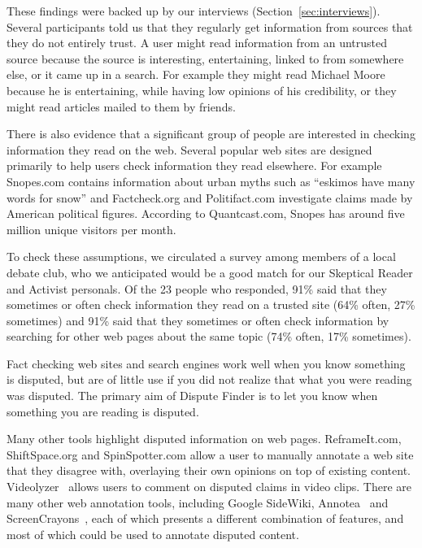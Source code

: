 \documentclass{www2010-submission}
\newcommand{\todo}[1]{}
\begin{document}
These findings were backed up by our interviews (Section~\ref{sec:interviews}). Several participants told us that they regularly get information from sources that they do not entirely trust. A user might read information from an untrusted source because the source is interesting, entertaining, linked to from somewhere else, or it came up in a search. For example they might read Michael Moore because he is entertaining, while having low opinions of his credibility, or they might read articles mailed to them by friends. 

\todo{Talk about people reading from a wide range of sources.}

There is also evidence that a significant group of people are interested in checking information they read on the web. Several popular web sites are designed primarily to help users check information they read elsewhere. For example Snopes.com contains information about urban myths such as ``eskimos have many words for snow'' and Factcheck.org and Politifact.com investigate claims made by American political figures. According to Quantcast.com, Snopes has around five million unique visitors per month.

To check these assumptions, we circulated a survey among members of a local debate club, who we anticipated would be a good match for our Skeptical Reader and Activist personals. Of the 23 people who responded, 91\% said that they sometimes or often check information they read on a trusted site (64\% often, 27\% sometimes) and 91\% said that they sometimes or often check information by searching for other web pages about the same topic (74\% often, 17\% sometimes).

\todo{Talk about our survey}

Fact checking web sites and search engines work well when you know something is disputed, but are of little use if you did not realize that what you were reading was disputed. The primary aim of Dispute Finder is to let you know when something you are reading is disputed.

Many other tools highlight disputed information on web pages. ReframeIt.com, ShiftSpace.org and SpinSpotter.com allow a user to manually annotate a web site that they disagree with, overlaying their own opinions on top of existing content. Videolyzer~\cite{Diakopoulos2008} allows users to comment on disputed claims in video clips. There are many other web annotation tools, including Google SideWiki, Annotea~\cite{Koivunen2001} and ScreenCrayons~\cite{Olsen2004}, each of which presents a different combination of features, and most of which could be used to annotate disputed content.
\end{document}
